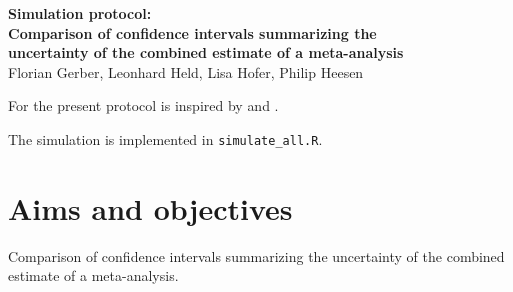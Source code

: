 \documentclass[letterpaper, 9pt]{article}
\begin{document}
\begin{center}
  {\noindent \LARGE \bf Simulation protocol:\\[2mm]
    Comparison of confidence intervals summarizing the\\[2mm]
    uncertainty of the combined estimate of a meta-analysis
  }\\
\bigskip
{\noindent \Large Florian Gerber, Leonhard Held, Lisa Hofer, Philip Heesen
}\end{center}
\bigskip
\vspace*{.5cm}


For the present protocol is inspired by \cite{burt:etal:06} and \cite{morr:etal:19}.


The simulation is implemented in \texttt{simulate\_all.R}.


\tableofcontents

\newpage 

\section{Aims and objectives}\label{ref:aims}
Comparison of confidence intervals summarizing the uncertainty of the combined estimate of a meta-analysis.
\end{document}
